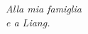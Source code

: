 \cleardoublepage
\thispagestyle{empty}
\null\vspace{2cm}
\begin{flushright}\emph{
	\small
	Alla mia famiglia\\
	e a Liang.}
\end{flushright}
\null
